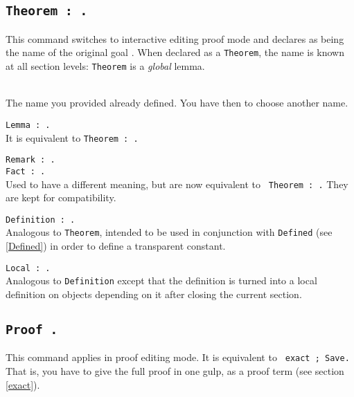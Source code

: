 \subsection{\tt Theorem {\ident} : {\form}.}\label{Theorem}
This command switches to interactive editing proof mode and declares
{\ident} as being the name of the original goal {\form}. When declared
as a {\tt Theorem}, the name {\ident} is known at all section levels:
{\tt Theorem} is a {\sl global} lemma.

\begin{ErrMsgs}
\item {}
\item \ident\ \\ 
  The name you provided already defined. You have then to choose
  another name.
\end{ErrMsgs}


\begin{Variants}
\item {\tt Lemma {\ident} : {\form}.}\\
  It is equivalent to {\tt Theorem {\ident} : {\form}.}
\item {\tt Remark {\ident} : {\form}.}\\
  {\tt Fact {\ident} : {\form}.}\\
  Used to have a different meaning, but are now equivalent to {\tt
  Theorem {\ident} : {\form}.} They are kept for compatibility.
\item {\tt Definition {\ident} : {\form}.}
\\
  Analogous to {\tt Theorem}, intended to be used in conjunction with
  {\tt Defined} (see \ref{Defined}) in order to define a
  transparent constant.
\item {\tt Local {\ident} : {\form}.}
\\
  Analogous to {\tt Definition} except that the definition is turned
  into a local definition on objects depending on it after closing the
  current section.
\end{Variants}

\subsection{\tt Proof {\term}.}
This command applies in proof editing mode. It is equivalent to {\tt
  exact {\term}; Save.} That is, you have to give the full proof in
one gulp, as a proof term (see section \ref{exact}).


